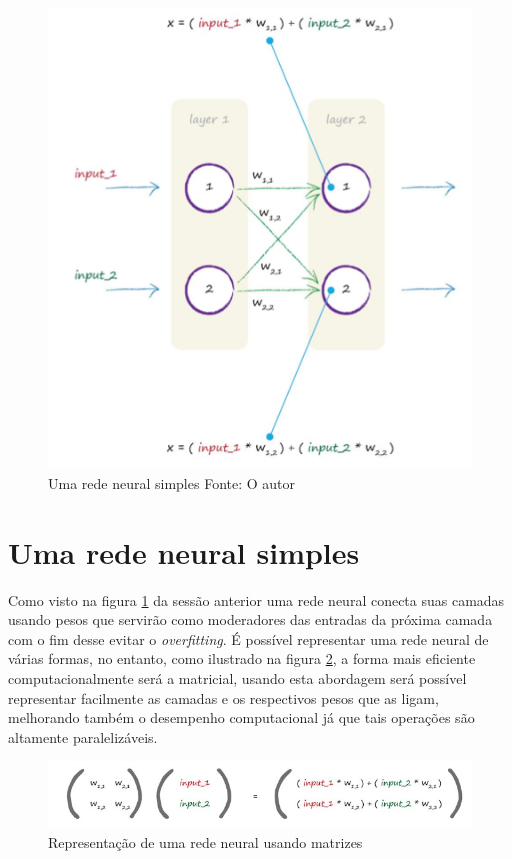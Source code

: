 \begin{apendicesenv}
		\begin{figure}[H]
			\centering
			\caption[Uma rede neural simples Fonte: O autor]{Uma rede neural simples Fonte: O autor}
			\label{fig:simpleNeuralNetwork}
			\includegraphics[width=0.7\linewidth]{images/TEMPSimpleNN}
		\end{figure}		

	\section{Uma rede neural simples}
		\par Como visto na figura \ref{fig:simpleNeuralNetwork} da sessão anterior uma rede neural conecta suas camadas usando pesos que servirão como moderadores das entradas da próxima camada com o fim desse evitar o \textit{overfitting}. É possível representar uma rede neural de várias formas, no entanto, como ilustrado na figura \ref{fig:matrixmultnn}, a forma mais eficiente computacionalmente será a matricial, usando esta abordagem será possível representar facilmente as camadas e os respectivos pesos que as ligam, melhorando também o desempenho computacional já que tais operações são altamente paralelizáveis.
		
		
		\begin{figure}[H]
			\centering
			\caption[Representação de uma rede neural usando matrizes]{Representação de uma rede neural usando matrizes}
			\label{fig:matrixmultnn}
			\includegraphics[width=0.7\linewidth]{images/TEMPMatrixMultNN}
		\end{figure}
		

\end{apendicesenv}
